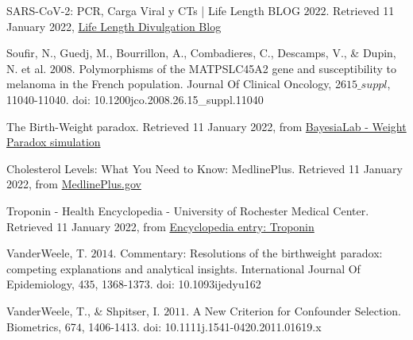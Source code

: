 \documentclass{article}
\begin{document}
SARS-CoV-2: PCR, Carga Viral y CTs | Life Length BLOG \(2022\). Retrieved 11 January 2022, \href{from https://lifelength.com/es/sars-cov-2-pcr-carga-viral-y-cts/}{Life Length Divulgation Blog}

Soufir, N., Guedj, M., Bourrillon, A., Combadieres, C., Descamps, V., \& Dupin, N. et al. \(2008\). Polymorphisms of the MATP\/SLC45A2 gene and susceptibility to melanoma in the French population. Journal Of Clinical Oncology, 26\(15\_suppl\), 11040-11040. doi: 10.1200\/jco.2008.26.15\_suppl.11040

The Birth-Weight paradox. Retrieved 11 January 2022, from \href{https://library.bayesia.com/articles/#!bayesialab-knowledge-hub/the-birth-weight-paradox}{BayesiaLab - Weight Paradox simulation}

Cholesterol Levels: What You Need to Know: MedlinePlus. Retrieved 11 January 2022, from \href{https://medlineplus.gov/cholesterollevelswhatyouneedtoknow.html}{MedlinePlus.gov}

Troponin - Health Encyclopedia - University of Rochester Medical Center. Retrieved 11 January 2022, from \href{https://www.urmc.rochester.edu/encyclopedia/content.aspx?contenttypeid=167&contentid=troponin}{Encyclopedia entry: Troponin}

VanderWeele, T. \(2014\). Commentary: Resolutions of the birthweight paradox: competing explanations and analytical insights. International Journal Of Epidemiology, 43\(5\), 1368-1373. doi: 10.1093\/ije\/dyu162

VanderWeele, T., \& Shpitser, I. \(2011\). A New Criterion for Confounder Selection. Biometrics, 67\(4\), 1406-1413. doi: 10.1111\/j.1541-0420.2011.01619.x
\end{document}
